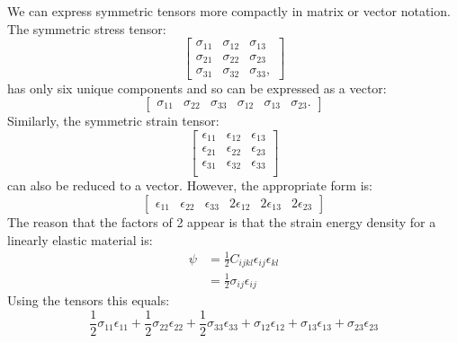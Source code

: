 \documentclass{article}
\begin{document}
We can express symmetric tensors more compactly in matrix or vector notation.  The symmetric stress tensor:
\begin{equation}
\begin{bmatrix}
    \sigma_{11} & \sigma_{12} & \sigma_{13} \\
    \sigma_{21} & \sigma_{22} & \sigma_{23} \\
    \sigma_{31} & \sigma_{32} & \sigma_{33},
\end{bmatrix}
\end{equation}
has only six unique components and so can be expressed as a vector:
\begin{equation}
\begin{bmatrix}
    \sigma_{11} & \sigma_{22} & \sigma_{33} & \sigma_{12} & \sigma_{13} & \sigma_{23}.
\end{bmatrix}
\end{equation}
Similarly, the symmetric strain tensor:
\begin{equation}
\begin{bmatrix}
\epsilon_{11} & \epsilon_{12} & \epsilon_{13} \\
\epsilon_{21} & \epsilon_{22} & \epsilon_{23} \\
\epsilon_{31} & \epsilon_{32} & \epsilon_{33} \\
\end{bmatrix}
\end{equation}
can also be reduced to a vector.  However, the appropriate form is:
\begin{equation}
\begin{bmatrix}
    \epsilon_{11} & \epsilon_{22} & \epsilon_{33} & 2 \epsilon_{12} & 2 \epsilon_{13} & 2 \epsilon_{23}
\end{bmatrix}
\end{equation}
The reason that the factors of 2 appear is that the strain energy density for a linearly elastic material is:
\begin{equation}
\begin{aligned}
\psi &= \frac{1}{2} C_{ijkl} \epsilon_{ij} \epsilon_{kl}\\
&= \frac{1}{2} \sigma_{ij} \epsilon_{ij}
\end{aligned}
\label{eq:strainenergy}
\end{equation}
Using the tensors this equals:
\begin{equation}
\frac{1}{2} \sigma_{11} \epsilon_{11} + \frac{1}{2} \sigma_{22} \epsilon_{22} + \frac{1}{2} \sigma_{33} \epsilon_{33} + \sigma_{12} \epsilon_{12} + \sigma_{13} \epsilon_{13} + \sigma_{23} \epsilon_{23}
\end{equation}
\end{document}
